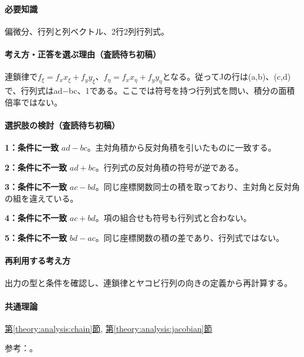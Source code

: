 \paragraph{必要知識} 偏微分、行列と列ベクトル、2行2列行列式。

\paragraph{考え方・正答を選ぶ理由（査読待ち初稿）} 連鎖律で\(f_\xi=f_xx_\xi+f_yy_\xi\)、\(f_\eta=f_xx_\eta+f_yy_\eta\)となる。従ってJの行は(a,b)、(c,d)で、行列式はad−bc、1である。ここでは符号を持つ行列式を問い、積分の面積倍率ではない。

\paragraph{選択肢の検討（査読待ち初稿）}\mbox{}\par

\noindent\textbf{1：条件に一致} \(ad-bc\)。主対角積から反対角積を引いたものに一致する。\par

\noindent\textbf{2：条件に不一致} \(ad+bc\)。行列式の反対角積の符号が逆である。\par

\noindent\textbf{3：条件に不一致} \(ac-bd\)。同じ座標関数同士の積を取っており、主対角と反対角の組を違えている。\par

\noindent\textbf{4：条件に不一致} \(ac+bd\)。項の組合せも符号も行列式と合わない。\par

\noindent\textbf{5：条件に不一致} \(bd-ac\)。同じ座標関数の積の差であり、行列式ではない。\par

\paragraph{再利用する考え方} 出力の型と条件を確認し、連鎖律とヤコビ行列の向きの定義から再計算する。

\paragraph{共通理論} \hyperref[theory:analysis:chain]{第\ref*{theory:analysis:chain}節}, \hyperref[theory:analysis:jacobian]{第\ref*{theory:analysis:jacobian}節}

\par 参考：\cite{mit_chain2007}。

